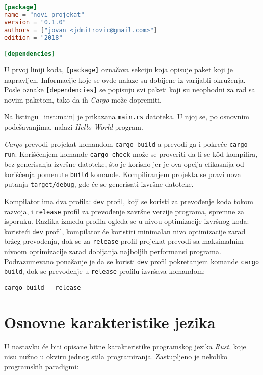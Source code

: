 \documentclass[12pt,oneside]{memoir}
\begin{document}
\begin{lstlisting}[language=TOML,
                   caption={Inicijalna \emph{Cargo.toml} datoteka},
                   label={inst:cargo}]
[package]
name = "novi_projekat"
version = "0.1.0"
authors = ["jovan <jdmitrovic@gmail.com>"]
edition = "2018"

[dependencies]
\end{lstlisting}

U prvoj liniji koda, \texttt{[package]} označava sekciju koja opisuje
paket koji je napravljen. Informacije koje se ovde nalaze su dobijene
iz varijabli okruženja. Posle oznake \texttt{[dependencies]} se
popisuju svi paketi koji su neophodni za rad sa novim paketom,
tako da ih \emph{Cargo} može dopremiti.

Na listingu~\ref{inst:main} je prikazana \texttt{main.rs} datoteka. U njoj se, po osnovnim
podešavanjima, nalazi \emph{Hello World} program.



\emph{Cargo} prevodi projekat komandom
\texttt{cargo build} a prevodi ga i pokreće
\texttt{cargo run}. Korišćenjem komande \texttt{cargo check}
može se proveriti da li se kôd kompilira, bez generisanja
izvršne datoteke, što je korisno jer je ova opcija efikasnija
od korišćenja pomenute \texttt{build} komande. Kompiliranjem
projekta se pravi nova putanja \texttt{target/debug}, gde će se
generisati izvršne datoteke.

Kompilator ima dva profila: \texttt{dev} profil, koji se koristi za prevođenje koda tokom razvoja, i
\texttt{release} profil za prevođenje završne verzije programa, spremne za isporuku. Razlika između
profila ogleda se u nivou optimizacije izvršnog koda: koristeći \texttt{dev} profil, kompilator
će koristiti minimalan nivo optimizacije zarad bržeg prevođenja, dok se za \texttt{release} profil
projekat prevodi sa maksimalnim nivoom optimizacije zarad dobijanja najboljih performansi
programa. Podrazumevano ponašanje je da se koristi \texttt{dev} profil pokretanjem
komande \texttt{cargo build}, dok se prevođenje u \texttt{release} profilu izvršava komandom:

\begin{lstlisting}[language={}, style=text]
cargo build --release
\end{lstlisting}

\section{Osnovne karakteristike jezika}
U nastavku će biti opisane bitne karakteristike programskog jezika \emph{Rust}, koje nisu nužno
u okviru jednog stila programiranja. Zastupljeno je nekoliko programskih paradigmi:
\end{document}
